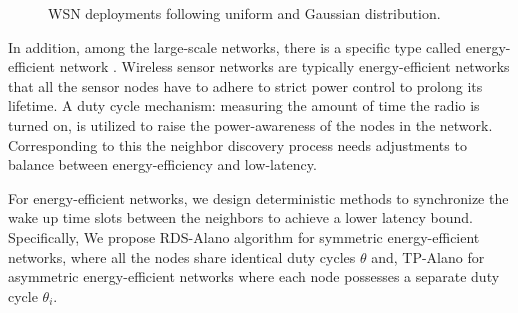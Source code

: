  
 \begin{figure}[!t]
\centering
{}
\vspace{0.03in}
\caption{WSN deployments following uniform and Gaussian distribution.}
\label{distribution}
\end{figure}


In addition, among the large-scale networks, there is a specific 
type called energy-efficient network \cite{jones2001survey}.
Wireless sensor networks are typically energy-efficient networks that all the sensor nodes have to adhere to 
strict power control to prolong its lifetime\cite{dunkels2011contikimac}.
A duty cycle mechanism: measuring the amount of time the radio is turned on, is 
utilized to raise the power-awareness of the nodes in the network.
Corresponding to this the neighbor discovery process 
needs adjustments to balance between energy-efficiency and low-latency.


For energy-efficient networks, we design deterministic methods
to synchronize the wake up time slots between the neighbors to achieve a lower latency bound.
Specifically, We propose RDS-Alano algorithm for symmetric energy-efficient networks, where 
all the nodes share identical duty cycles $\theta$ and, TP-Alano for
asymmetric energy-efficient networks where each node possesses a separate duty cycle $\theta_i$. 


